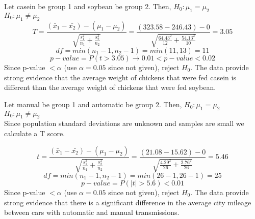 
{
Let casein be group 1 and soybean be group 2. Then,
$H_0: \mu_1 = \mu_2$ \\
$H_0: \mu_1 \ne \mu_2$ \\
\[ T = \frac{(\bar{x}_1 - \bar{x_2}) - (\mu_1 - \mu_2)}{\sqrt{ \frac{s_1^2}{n_1} + \frac{s_2^2}{n_2} }} = \frac{(323.58 - 246.43) - 0}{ \sqrt{\frac{64.43^2}{12} + \frac{54.13^2}{10}} } = 3.05 \]
\[ df = min(n_1 - 1, n_2 - 1) = min(11,13) = 11 \]
\[ p-value = P(t > 3.05) \rightarrow 0.01 < p-value < 0.02 \]
Since p-value $< \alpha$ (use $\alpha = 0.05$ since not given), reject $H_0$. The data provide strong evidence that the average weight of chickens that were fed casein is different than the average weight of chickens that were fed soybean.}


{
Let manual be group 1 and automatic be group 2. Then,
$H_0: \mu_1 = \mu_2$ \\
$H_0: \mu_1 \ne \mu_2$ \\
Since population standard deviations are unknown and samples are small we calculate a T score.

\[ t = \frac{(\bar{x}_1 - \bar{x_2}) - (\mu_1 - \mu_2)}{\sqrt{ \frac{s_1^2}{n_1} + \frac{s_2^2}{n_2} }} = \frac{(21.08 - 15.62) - 0}{ \sqrt{\frac{4.29^2}{26} + \frac{2.76^2}{26}} } = 5.46 \]
\[ df = min(n_1 - 1, n_2 - 1) = min(26 - 1, 26 - 1) = 25 \]
\[ p-value = P(|t| > 5.6) < 0.01 \]
Since p-value $< \alpha$ (use $\alpha = 0.05$ since not given), reject $H_0$. The data provide strong evidence that there is a significant difference in the average city mileage between cars with automatic and manual transmissions.}\label{epaMPG2010}

